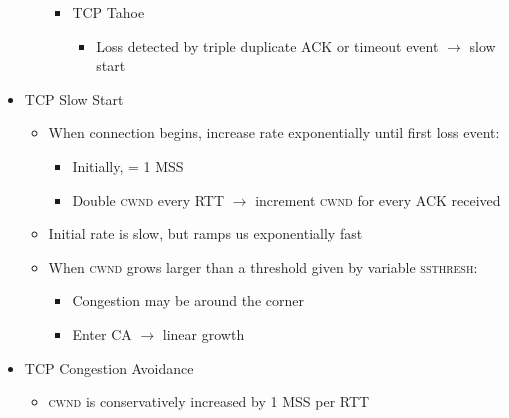 \begin{itemize}
\begin{itemize}
\begin{itemize}
\begin{itemize}
            \end{itemize}

          \item TCP Tahoe

            \begin{itemize}

              \item Loss detected by triple duplicate ACK or timeout event $\to$ slow start

            \end{itemize}

        \end{itemize}

    \end{itemize}

  \item TCP Slow Start

    \begin{itemize}

      \item When connection begins, increase rate exponentially until first loss event:

        \begin{itemize}

          \item Initially,  = 1 MSS

          \item Double \textsc{cwnd} every RTT $\to$ increment \textsc{cwnd} for every ACK received

        \end{itemize}

      \item Initial rate is slow, but ramps us exponentially fast

      \item When \textsc{cwnd} grows larger than a threshold given by variable \textsc{ssthresh}:

        \begin{itemize}

          \item Congestion may be around the corner

          \item Enter CA $\to$ linear growth

        \end{itemize}

    \end{itemize}

  \item TCP Congestion Avoidance

    \begin{itemize}

      \item \textsc{cwnd} is conservatively increased by 1 MSS per RTT

    \end{itemize}

\end{itemize}



